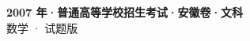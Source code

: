 \documentclass[zihao=-4, a4paper]{ctexart}
\begin{document}
\begin{center}
  {\Large\bfseries 2007 年·普通高等学校招生考试·安徽卷·文科}\\[4pt]
  {\large 数学 · 试题版}
\end{center}
\medskip
{}

\end{document}
